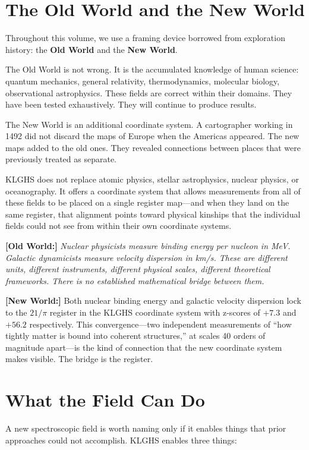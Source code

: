 \documentclass[11pt, letterpaper, openany]{book}
\newcommand{\oldworld}[1]{\noindent\textbf{\color{goldseal}[Old World:]} \textit{#1}\medskip}
\newcommand{\newworld}[1]{\noindent\textbf{\color{kishblue}[New World:]} #1\medskip}
\begin{document}
\section{The Old World and the New World}

Throughout this volume, we use a framing device borrowed from exploration history:
the \textbf{Old World} and the \textbf{New World}.

The Old World is not wrong. It is the accumulated knowledge of human science: quantum
mechanics, general relativity, thermodynamics, molecular biology, observational
astrophysics. These fields are correct within their domains. They have been tested
exhaustively. They will continue to produce results.

The New World is an additional coordinate system. A cartographer working in 1492
did not discard the maps of Europe when the Americas appeared. The new maps added
to the old ones. They revealed connections between places that were previously
treated as separate.

KLGHS does not replace atomic physics, stellar astrophysics, nuclear physics, or
oceanography. It offers a coordinate system that allows measurements from all of
these fields to be placed on a single register map---and when they land on the same
register, that alignment points toward physical kinships that the individual fields
could not see from within their own coordinate systems.

\oldworld{Nuclear physicists measure binding energy per nucleon in MeV. Galactic
dynamicists measure velocity dispersion in km/s. These are different units,
different instruments, different physical scales, different theoretical frameworks.
There is no established mathematical bridge between them.}

\newworld{Both nuclear binding energy and galactic velocity dispersion lock to
the $21/\pi$ register in the KLGHS coordinate system with z-scores of $+7.3$
and $+56.2$ respectively. This convergence---two independent measurements of
``how tightly matter is bound into coherent structures,'' at scales 40 orders
of magnitude apart---is the kind of connection that the new coordinate system
makes visible. The bridge is the register.}

\section{What the Field Can Do}

A new spectroscopic field is worth naming only if it enables things that prior
approaches could not accomplish. KLGHS enables three things:
\end{document}
